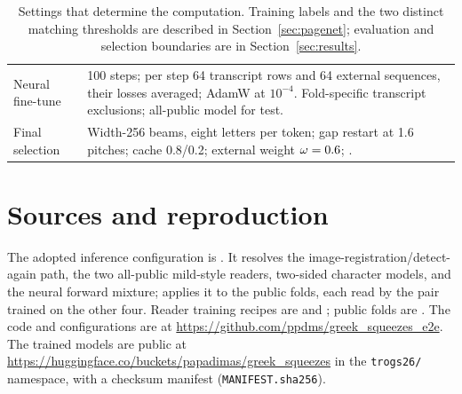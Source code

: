 \documentclass[11pt]{article}
\newcommand{\code}[1]{\texttt{#1}}
\begin{document}
\begin{table}[htbp]
\begin{tabular}{@{}lp{}@{}}
Neural fine-tune & 100 steps; per step 64 transcript rows and 64 external sequences, their losses
averaged; AdamW at $10^{-4}$. Fold-specific transcript exclusions; all-public model for test. \\
Final selection & Width-256 beams, eight letters per token; gap restart at 1.6 pitches; cache
0.8/0.2; external weight $\omega=0.6{}$; \DevCombo{}. \\
\bottomrule
\end{tabular}
\caption{Settings that determine the computation. Training labels and the two distinct matching thresholds
are described in Section~\ref{sec:pagenet}; evaluation and selection boundaries are in
Section~\ref{sec:results}.}
\label{tab:recipe}
\end{table}

\FloatBarrier
\section{Sources and reproduction}
\label{app:external}
The adopted inference configuration is . It resolves the
image-registration/detect-again path, the two all-public mild-style readers, two-sided character models,
and the neural forward mixture;  applies it to the
public folds, each read by the pair trained on the other four. Reader training recipes are
 and ; public folds are
. The code and configurations are at
\url{https://github.com/ppdms/greek_squeezes_e2e}. The trained models are public at
\url{https://huggingface.co/buckets/papadimas/greek_squeezes} in the \code{trogs26/} namespace,
with a checksum manifest (\code{MANIFEST.sha256}).
\end{document}
